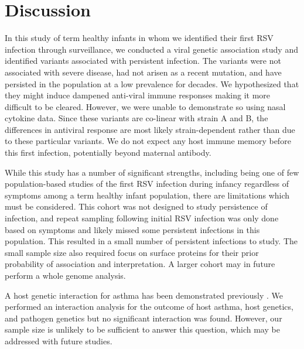 \documentclass{article}
\begin{document}
\section{Discussion}
In this study of term healthy infants in whom we identified their first RSV infection through surveillance, we conducted a viral genetic association study and identified variants associated with persistent infection. 
The variants were not associated with severe disease, had not arisen as a recent mutation, and have persisted in the population at a low prevalence for decades.
We hypothesized that they might induce dampened anti-viral immune responses making it more difficult to be cleared. 
However, we were unable to demonstrate so using nasal cytokine data.
Since these variants are co-linear with strain A and B, the differences in antiviral response are most likely strain-dependent rather than due to these particular variants.
We do not expect any host immune memory before this first infection, potentially beyond maternal antibody.

While this study has a number of significant strengths, including being one of few population-based studies of the first RSV infection during infancy regardless of symptoms among a term healthy infant population, there are limitations which must be considered.
This cohort was not designed to study persistence of infection, and repeat sampling following initial RSV infection was only done based on symptoms and likely missed some persistent infections in this population. 
This resulted in a small number of persistent infections to study.
The small sample size also required focus on surface proteins for their prior probability of association and interpretation.
A larger cohort may in future perform a whole genome analysis.

A host genetic interaction for asthma has been demonstrated previously 
\cite{moffatt2010large}.
We performed an interaction analysis for the outcome of host asthma, host genetics, and pathogen genetics 
but no significant interaction was found. 
However, our sample size is unlikely to be sufficient to answer this question, 
which may be addressed with future studies. 
\end{document}
